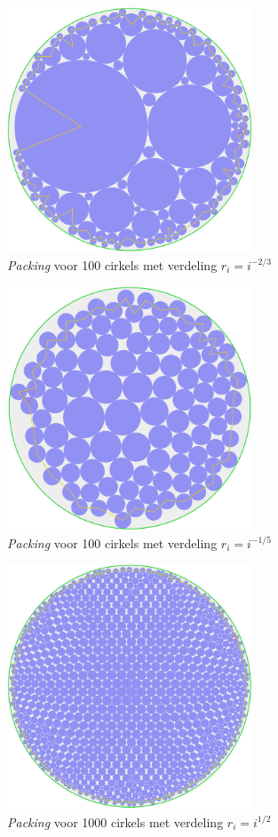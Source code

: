 \documentclass[12pt,a4paper,oneside]{book}
\begin{document}
{\begin{figure}
  \centering
  \includegraphics[width=0.65\textwidth]{packing-neg2div3-100.png}
  \caption{\textit{Packing} voor 100 cirkels met verdeling $r_i=i^{-2/3}$}
\end{figure}

\begin{figure}
  \centering
  \includegraphics[width=0.65\textwidth]{packing-neg1div5-100.png}
  \caption{\textit{Packing} voor 100 cirkels met verdeling $r_i=i^{-1/5}$}
\end{figure}

\begin{figure}
  \centering
  \includegraphics[width=0.65\textwidth]{packing-1div2-1000.png}
  \caption{\textit{Packing} voor 1000 cirkels met verdeling $r_i=i^{1/2}$}
\end{figure}

}
\end{document}
